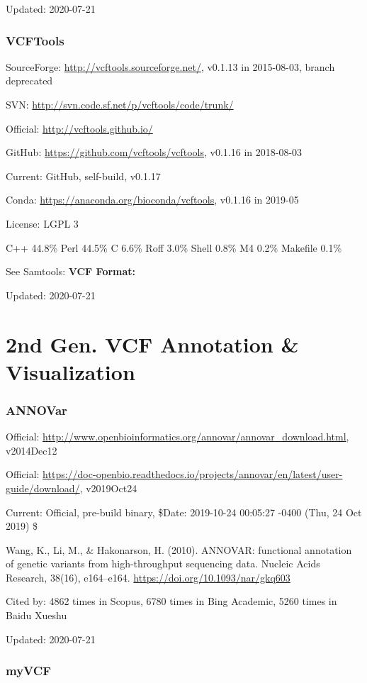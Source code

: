 \documentclass[]{article}
\newcommand{\cb}[3]{\par Cited by: {\color{blue}\Huge #1} times in Scopus, {\color{blue}\Huge #2} times in Bing Academic, {\color{blue}\Huge #3} times in Baidu Xueshu}
\begin{document}
Updated: 2020-07-21

\section{VCFTools}

SourceForge: \url{http://vcftools.sourceforge.net/}, v0.1.13 in 2015-08-03, branch deprecated

SVN: \url{http://svn.code.sf.net/p/vcftools/code/trunk/}

Official: \url{http://vcftools.github.io/}

GitHub: \url{https://github.com/vcftools/vcftools}, v0.1.16 in 2018-08-03

Current: GitHub, self-build, v0.1.17

Conda: \url{https://anaconda.org/bioconda/vcftools}, v0.1.16 in 2019-05

License: LGPL 3

C++ 44.8\% Perl 44.5\% C 6.6\% Roff 3.0\% Shell 0.8\% M4 0.2\% Makefile 0.1\%

See Samtools: \textbf{VCF Format:}

Updated: 2020-07-21

\part{2nd Gen. VCF Annotation \& Visualization}
\section{ANNOVar}

Official: \url{http://www.openbioinformatics.org/annovar/annovar_download.html}, v2014Dec12

Official: \url{https://doc-openbio.readthedocs.io/projects/annovar/en/latest/user-guide/download/}, v2019Oct24

Current: Official, pre-build binary, \$Date: 2019-10-24 00:05:27 -0400 (Thu, 24 Oct 2019) \$

Wang, K., Li, M., \& Hakonarson, H. (2010). ANNOVAR: functional annotation of genetic variants from high-throughput sequencing data. Nucleic Acids Research, 38(16), e164–e164. \url{https://doi.org/10.1093/nar/gkq603}\cb{4862}{6780}{5260}

Updated: 2020-07-21

\section{myVCF}
\end{document}
